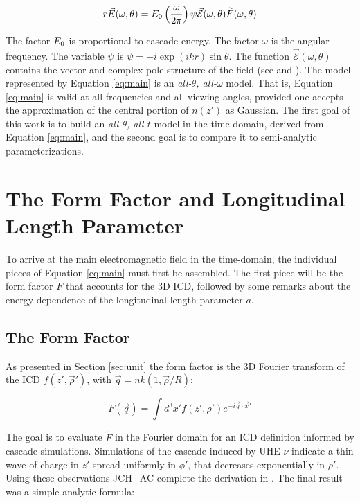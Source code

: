 \documentclass[amsmath,amssymb,aps,prd,10pt,twocolumn]{revtex4}
\begin{document}
\begin{equation}
r\vec{E}(\omega,\theta) = E_{\rm 0} \left( \frac{\omega}{2\pi} \right) \psi \vec{\mathcal{E}}(\omega,\theta) \widetilde{F}(\omega,\theta) \label{eq:main}
\end{equation}

The factor $E_{\rm 0}$ is proportional to cascade energy.  The factor $\omega$ is the angular frequency.  The variable $\psi$ is $\psi = -i \exp(ikr) \sin\theta$.  The function $\vec{\mathcal{E}}(\omega,\theta)$ contains the vector and complex pole structure of the field (see \cite{10.1103/physrevd.65.016003} and \cite{10.1016/j.astropartphys.2017.03.008}).  The model represented by Equation \ref{eq:main} is an \textit{all-$\theta$, all-$\omega$} model.  That is, Equation \ref{eq:main} is valid at all frequencies and all viewing angles, provided one accepts the approximation of the central portion of $n(z')$ as Gaussian.  The first goal of this work is to build an \textit{all-$\theta$, all-$t$} model in the time-domain, derived from Equation \ref{eq:main}, and the second goal is to compare it to semi-analytic parameterizations.

\section{The Form Factor and Longitudinal Length Parameter}
\label{sec:ff}

To arrive at the main electromagnetic field in the time-domain, the individual pieces of Equation \ref{eq:main} must first be assembled.  The first piece will be the form factor $\widetilde{F}$ that accounts for the 3D ICD, followed by some remarks about the energy-dependence of the longitudinal length parameter $a$.

\subsection{The Form Factor}
\label{sec:ff1}

As presented in Section \ref{sec:unit} the form factor is the 3D Fourier transform of the ICD $f(z',\vec{\rho}')$, with $\vec{q} = nk(1, \vec{\rho}/R)$:

\begin{equation}
F(\vec{q}) = \int d^3 x' f(z',\rho') e^{-i \vec{q} \cdot \vec{x}'}
\end{equation}

The goal is to evaluate $\widetilde{F}$ in the Fourier domain for an ICD definition informed by cascade simulations.  Simulations of the cascade induced by UHE-$\nu$ indicate a thin wave of charge in $z'$ spread uniformly in $\phi'$, that decreases exponentially in $\rho'$.  Using these observations JCH+AC complete the derivation in \cite{10.1016/j.astropartphys.2017.03.008}.  The final result was a simple analytic formula:
\end{document}
